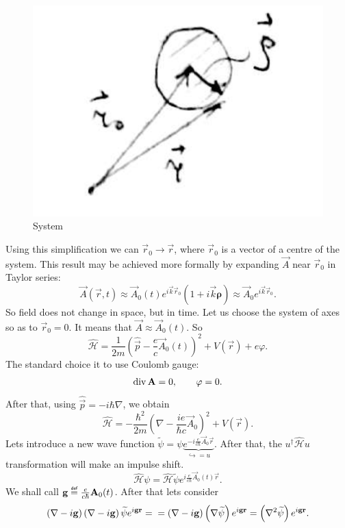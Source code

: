 \begin{figure}[h!]
	\centering
	\includegraphics[width=0.3\linewidth]{fig/L4/simply}
	\caption{System}
	\label{fig:simply}
\end{figure}


Using this simplification we can $\vec{r}_0 \to \vec{r}$, where $\vec{r}_0$ is a vector of a centre of the system. This result may be achieved more formally by expanding $\vec{A}$ near $\vec{r}_0$ in Taylor series:
\begin{equation}
	\vec{A} (\vec{r},t) \approx \vec{A}_0 (t) e^{i \vec{k} \vec{r}_0} \left( 1 + i \vec{k} \bm{\rho} \right) \approx \vec{A}_0 e^{i \vec{k} \vec{r}_0}.
\end{equation}
So field does not change in space, but in time. Let us choose the system of axes so as to $\vec{r}_0 = 0$. It means that $\vec{A} \approx \vec{A}_0 (t)$. So
\begin{equation}
	\hat{\mathscr{H}} = \frac{1}{2m} \left( \hat{\vec{p}}  - \frac{e}{c} \vec{A}_0(t) \right)^2 + V (\vec{r}) + e \varphi.
\end{equation}
The standard choice it to use Coulomb gauge:
\begin{equation}
	\Div \vec{A} = 0, \qquad \varphi = 0.
\end{equation}
After that, using $\hat{\vec{p}} = -i \hbar \nabla$, we obtain
\begin{equation}
	\hat{\mathscr{H}} = - \frac{\hbar^2}{2m} \left( \nabla - \frac{i e}{\hbar c} \vec{A}_0  \right)^2 + V(\vec{r}).
\end{equation}
Lets introduce a new wave function $\widetilde{\psi} = \psi \underbrace{e^{- i \frac{e}{c \hbar} \vec{A}_0 \vec{r}}}_{\hookrightarrow = u}$. After that, the $ u^{\dagger} \hat{\mathscr{H}} u $ transformation will make an impulse shift.
\begin{equation}
	\hat{\mathscr{H}} \psi = \hat{\mathscr{H}} \widetilde{\psi} e^{i \frac{e}{c \hbar} \vec{A}_0 (t) \vec{r}}.
\end{equation}
We shall call $\vec{g} \myeq \frac{e}{c \hbar} \vec{A}_0 (t)$. After that lets consider
\begin{equation}
	\left( \nabla - i \vec{g} \right) \left( \nabla - i \vec{g} \right) \widetilde{\psi} e^{i \vec{g} \vec{r}} = \\ = \left( \nabla - i \vec{g} \right) \left( \nabla \widetilde{\psi}  \right) e^{i \vec{g} \vec{r}} = \left( \nabla^2 \widetilde{\psi} \right) e^{i \vec{g} \vec{r}}.
\end{equation}
